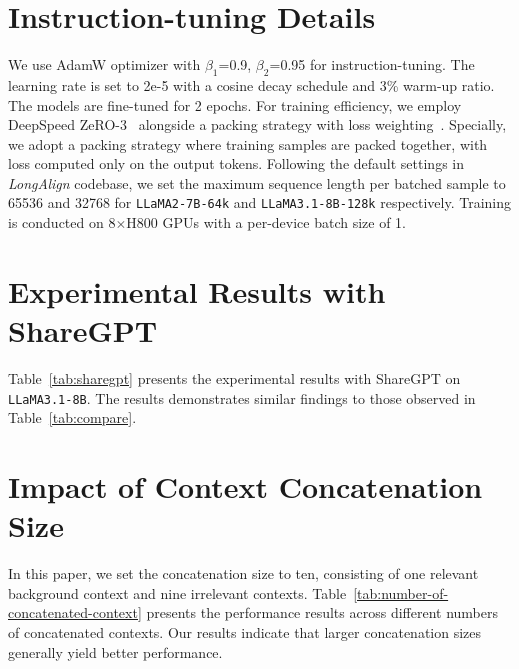 \section{Instruction-tuning Details}
\label{sec:instruction-tuning-details}
We use AdamW optimizer with $\beta_1$=0.9, $\beta_2$=0.95 for instruction-tuning. 
The learning rate is set to 2e-5 with a cosine decay schedule and 3\% warm-up ratio.
The models are fine-tuned for 2 epochs.
For training efficiency, we employ DeepSpeed ZeRO-3~\cite{rasley2020deepspeed} alongside a packing strategy with loss weighting~\cite{bai2024longalign}.
Specially, we adopt a packing strategy where training samples are packed together, with loss computed only on the output tokens. 
Following the default settings in \textit{LongAlign} codebase, we set the maximum sequence length per batched sample to 65536 and 32768 for \texttt{LLaMA2-7B-64k} and \texttt{LLaMA3.1-8B-128k} respectively.
Training is conducted on 8$\times$H800 GPUs with a per-device batch size of 1.

\section{Experimental Results with ShareGPT}
\label{sec:llama3.1-sharegpt}
Table~\ref{tab:sharegpt} presents the experimental results with ShareGPT on \texttt{LLaMA3.1-8B}. 
The results demonstrates similar findings to those observed in Table~\ref{tab:compare}.

\section{Impact of Context Concatenation Size}
\label{sec:number-of-concatenated-context}
In this paper, we set the concatenation size to ten, consisting of one relevant background context and nine irrelevant contexts.
Table~\ref{tab:number-of-concatenated-context} presents the performance results across different numbers of concatenated contexts.
Our results indicate that larger concatenation sizes generally yield better performance.

